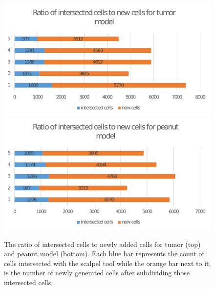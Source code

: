 \begin{figure}[H]
  \centering
  \includegraphics[width=1.0\linewidth]{figures/cutting/cutting_intersected_vs_new_tumor.pdf}
  \includegraphics[width=1.0\linewidth]{figures/cutting/cutting_intersected_vs_new_peanut.pdf}
  \caption{\label{fig:cutting_intersected_vs_new}
  {The ratio of intersected cells to newly added cells for tumor (top) and peanut model (bottom). Each blue bar represents the count of cells 
  intersected with the scalpel tool while the orange bar next to it, is the number of newly generated cells after subdividing those intersected cells.}
}
\end{figure}

